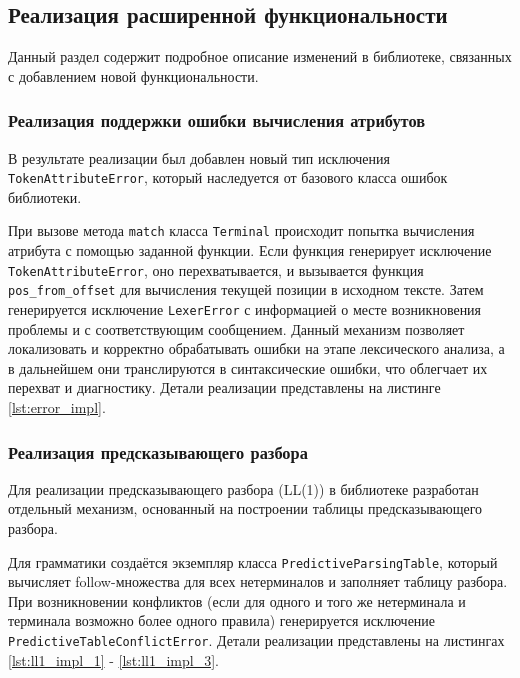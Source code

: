 \documentclass[14pt, russian]{scrartcl}
\begin{document}
\subsection{Реализация расширенной функциональности}

Данный раздел содержит подробное описание изменений в библиотеке, связанных с добавлением новой функциональности.

\subsubsection{Реализация поддержки ошибки вычисления атрибутов}

В результате реализации был добавлен новый тип исключения \texttt{TokenAttributeError}, который наследуется от
базового класса ошибок библиотеки.

При вызове метода \texttt{match} класса \texttt{Terminal} происходит попытка вычисления атрибута с помощью
заданной функции. Если функция генерирует исключение \texttt{TokenAttributeError}, оно перехватывается,
и вызывается функция \texttt{pos\_from\_offset} для вычисления текущей позиции в исходном тексте.
Затем генерируется исключение \texttt{LexerError} с информацией о месте возникновения проблемы и с
соответствующим сообщением. Данный механизм позволяет локализовать и корректно обрабатывать ошибки на этапе
лексического анализа, а в дальнейшем они транслируются в синтаксические ошибки, что облегчает их перехват
и диагностику. Детали реализации представлены на листинге \ref{lst:error_impl}.

\subsubsection{Реализация предсказывающего разбора}

Для реализации предсказывающего разбора (LL(1)) в библиотеке разработан отдельный механизм, основанный на
построении таблицы предсказывающего разбора.

Для грамматики создаётся экземпляр класса \texttt{PredictiveParsingTable}, который вычисляет follow-множества
для всех нетерминалов и заполняет таблицу разбора. При возникновении конфликтов (если для одного и того же
нетерминала и терминала возможно более одного правила) генерируется исключение
\texttt{PredictiveTableConflictError}. Детали реализации представлены на листингах \ref{lst:ll1_impl_1}
- \ref{lst:ll1_impl_3}.
\end{document}
